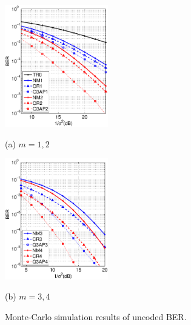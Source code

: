\documentclass[journal,draftcls,onecolumn,12pt,twoside]{IEEEtran}
\begin{document}
\begin{figure}[!t]
  \begin{minipage}[b]{.48\linewidth}
    \centering
    \centerline{\includegraphics[width=4.5cm]{./figs/BER_noise_power_MonteCarlo_64QAM_12.eps}}
    \centerline{(a) $m=1,2$}\medskip
  \end{minipage}
  \hfill
  \begin{minipage}[b]{0.48\linewidth}
    \centering
    \centerline{\includegraphics[width=4.5cm]{./figs/BER_noise_power_MonteCarlo_64QAM_34.eps}}
    \centerline{(b) $m=3,4$}\medskip
  \end{minipage}
  \caption{Monte-Carlo simulation results of uncoded BER.}
  \label{fig:uncoded_noisepower_mc}
\end{figure}
\end{document}

